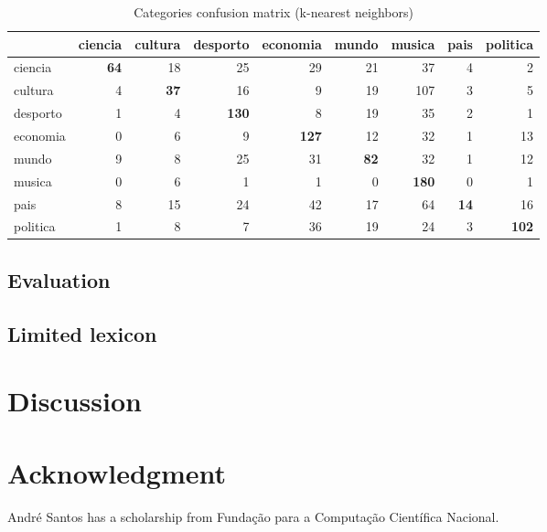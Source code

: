 \documentclass[conference]{IEEEtran}
\begin{document}
\begin{table}[htbp]
    \caption{Categories confusion matrix (k-nearest neighbors)}
\begin{center}
\begin{tabular}{l|rrrrrrrr}
              & ciencia     & cultura     & desporto     & economia     & mundo       & musica       & pais        & politica \\\hline
ciencia       & \textbf{64} & 18          & 25           & 29           & 21          & 37           & 4           & 2 \\
cultura       & 4           & \textbf{37} & 16           & 9            & 19          & 107          & 3           & 5 \\
desporto      & 1           & 4           & \textbf{130} & 8            & 19          & 35           & 2           & 1 \\
economia      & 0           & 6           & 9            & \textbf{127} & 12          & 32           & 1           & 13 \\
mundo         & 9           & 8           & 25           & 31           & \textbf{82} & 32           & 1           & 12 \\
musica        & 0           & 6           & 1            & 1            & 0           & \textbf{180} & 0           & 1 \\
pais          & 8           & 15          & 24           & 42           & 17          & 64           & \textbf{14} & 16 \\
politica      & 1           & 8           & 7            & 36           & 19          & 24           & 3           & \textbf{102} \\

\end{tabular}
\label{tab1}
\end{center}
\end{table}
\subsection{Evaluation}
\subsection{Limited lexicon}

\section{Discussion}


\section*{Acknowledgment}

André Santos has a scholarship from Fundação para a
Computação Científica Nacional.



\end{document}
